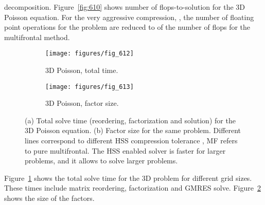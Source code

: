 \documentclass{article}
\begin{document}
decomposition.
Figure~\ref{fig:610} shows number of flops-to-solution for the 3D
Poisson equation. For the very aggressive compression,
, the number of floating point operations for the
 problem are reduced to  of the number of flops for the
multifrontal method.
\begin{figure}
  \begin{center}
    \begin{subfigure}{.49\textwidth}
      \texttt{[image: figures/fig\_612]}
      \caption{\footnotesize 3D Poisson, total time.}
      \label{fig:612}
    \end{subfigure}
    \begin{subfigure}{.49\textwidth}
      \texttt{[image: figures/fig\_613]}
      \caption{\footnotesize 3D Poisson, factor size.}
      \label{fig:613}
    \end{subfigure}
  \end{center}
  \caption{\footnotesize (a) Total solve time (reordering, factorization and
    solution) for the 3D  Poisson equation. (b) Factor size for
    the same problem. Different lines correspond to different HSS
    compression tolerance , MF refers to pure
    multifrontal. The HSS enabled solver is faster for larger
    problems, and it allows to solve larger problems.}
  \label{fig:Poisson3D_time_mem}
\end{figure}
Figure~\ref{fig:612} shows the total solve time for the 3D problem for
different grid sizes. These times include matrix reordering,
factorization and GMRES solve. Figure~\ref{fig:613} shows the size of
the factors.
\end{document}
